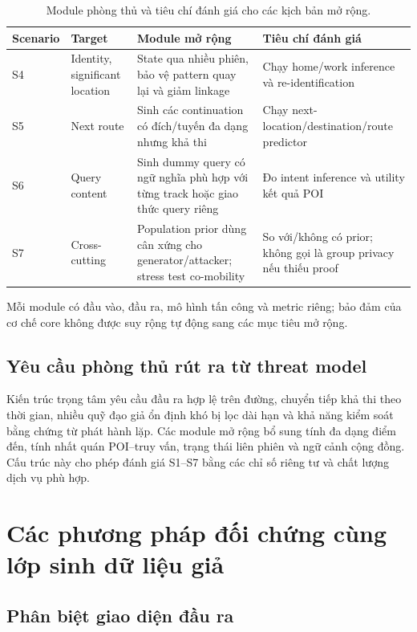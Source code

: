 \documentclass[12pt,a4paper,oneside]{report}
\begin{document}
\begin{table}[htbp]
\centering
\small
\caption{Module phòng thủ và tiêu chí đánh giá cho các kịch bản mở rộng.}
\label{tab:extensions}
\begin{tabularx}{\textwidth}{P{1.55cm}P{2.35cm}Y Y}
\toprule
\textbf{Scenario} & \textbf{Target} & \textbf{Module mở rộng} & \textbf{Tiêu chí đánh giá} \\
\midrule
S4 & Identity, significant location & State qua nhiều phiên, bảo vệ pattern quay lại và giảm linkage & Chạy home/work inference và re-identification \\
S5 & Next route & Sinh các continuation có đích/tuyến đa dạng nhưng khả thi & Chạy next-location/destination/route predictor \\
S6 & Query content & Sinh dummy query có ngữ nghĩa phù hợp với từng track hoặc giao thức query riêng & Đo intent inference và utility kết quả POI \\
S7 & Cross-cutting & Population prior dùng cân xứng cho generator/attacker; stress test co-mobility & So với/không có prior; không gọi là group privacy nếu thiếu proof \\
\bottomrule
\end{tabularx}
\end{table}

Mỗi module có đầu vào, đầu ra, mô hình tấn công và metric riêng; bảo đảm của cơ chế core không được suy rộng tự động sang các mục tiêu mở rộng.

\section{Yêu cầu phòng thủ rút ra từ threat model}

Kiến trúc trọng tâm yêu cầu đầu ra hợp lệ trên đường, chuyển tiếp khả thi theo thời gian, nhiều quỹ đạo giả ổn định khó bị lọc dài hạn và khả năng kiểm soát bằng chứng từ phát hành lặp. Các module mở rộng bổ sung tính đa dạng điểm đến, tính nhất quán POI--truy vấn, trạng thái liên phiên và ngữ cảnh cộng đồng. Cấu trúc này cho phép đánh giá S1--S7 bằng các chỉ số riêng tư và chất lượng dịch vụ phù hợp.

\chapter{Các phương pháp đối chứng cùng lớp sinh dữ liệu giả}

\section{Phân biệt giao diện đầu ra}
\end{document}
